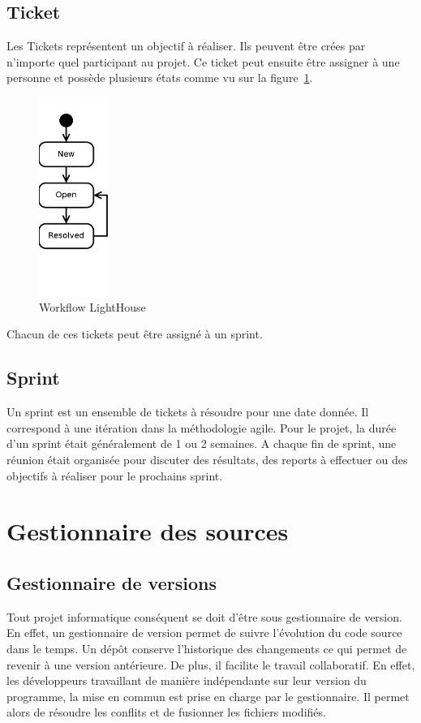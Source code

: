 \subsection{Ticket}
Les Tickets représentent un objectif à réaliser.
Ils peuvent être crées par n'importe quel participant au projet.
Ce ticket peut ensuite être assigner à une personne et possède plusieurs états comme vu sur la figure~\ref{fig:workflow}.
\begin{figure}[H]
	\centering
	\includegraphics[width=0.2\textwidth]{../image/lighthouseWorkFlow.png}
	\caption{Workflow LightHouse}
\label{fig:workflow}
\end{figure}
Chacun de ces tickets peut être assigné à un sprint.
\subsection{Sprint}
Un sprint est un ensemble de tickets à résoudre pour une date donnée.
Il correspond à une itération dans la méthodologie agile.
Pour le projet, la durée d'un sprint était généralement de 1 ou 2 semaines.
A chaque fin de sprint, une réunion était organisée pour discuter des résultats, des reports à effectuer ou des objectifs à réaliser pour le prochains sprint.

\section{Gestionnaire des sources}
\subsection{Gestionnaire de versions}
Tout projet informatique conséquent se doit d'être sous gestionnaire de version.
En effet, un gestionnaire de version permet de suivre l'évolution du code source dans le temps.
Un dépôt conserve l'historique des changements ce qui permet de revenir à une version antérieure.
De plus, il facilite le travail collaboratif.
En effet, les développeurs travaillant de manière indépendante sur leur version du programme, la mise en commun est prise en charge par le gestionnaire.
Il permet alors de résoudre les conflits et de fusionner les fichiers modifiés.

